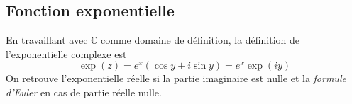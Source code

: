     
    \subsection{Fonction exponentielle}
    En travaillant avec $\mathbb{C}$ comme domaine de définition, la définition de l'exponentielle 
    complexe est 
    \begin{equation}
    \exp(z) = e^x(\cos y + i \sin y) = e^x\exp(iy)
    \end{equation}
    On retrouve l'exponentielle réelle si la partie imaginaire est nulle et la \textit{formule d'Euler}
    en cas de partie réelle nulle.\\
    
